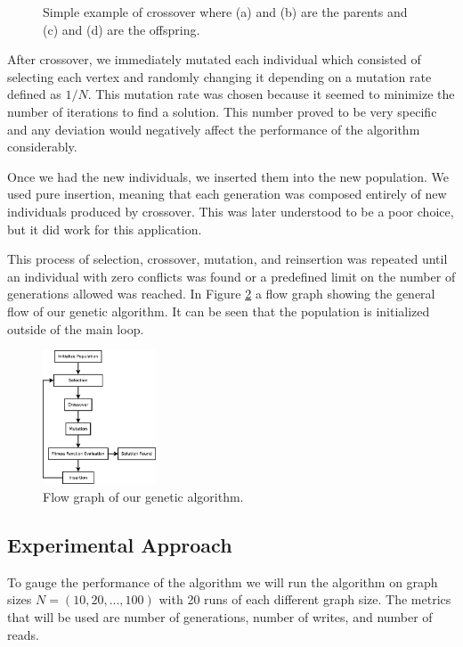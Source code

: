 \documentclass{article}
\begin{document}
\begin{figure}[h!]
\begin{subfigure}{0.18\textwidth}
		\end{subfigure}
		
		\caption{Simple example of crossover where (a) and (b) are the parents and (c) and (d) are the offspring.}
		\label{cross_example}
	\end{figure}
	
	After crossover, we immediately mutated each individual which consisted of selecting each vertex and randomly changing it depending on a mutation rate defined as $1/N$. This mutation rate was chosen because it seemed to minimize the number of iterations to find a solution. This number proved to be very specific and any deviation would negatively affect the performance of the algorithm considerably. 
	
	Once we had the new individuals, we inserted them into the new population. We used pure insertion, meaning that each generation was composed entirely of new individuals produced by crossover. This was later understood to be a poor choice, but it did work for this application. 
	
	This process of selection, crossover, mutation, and reinsertion was repeated until an individual with zero conflicts was found or a predefined limit on the number of generations allowed was reached. In Figure \ref{genetic_flow} a flow graph showing the general flow of our genetic algorithm. It can be seen that the population is initialized outside of the main loop. 
	
	\begin{figure}[h!]
		\centering
		\includegraphics[width=0.3\textwidth]{images/genetic_flo}
		\caption{Flow graph of our genetic algorithm.}
		\label{genetic_flow}
	\end{figure}
	
	\subsection{Experimental Approach}
	To gauge the performance of the algorithm we will run the algorithm on graph sizes $N = (10, 20, ..., 100)$ with 20 runs of each different graph size. The metrics that will be used are number of generations, number of writes, and number of reads.
	
\end{document}
